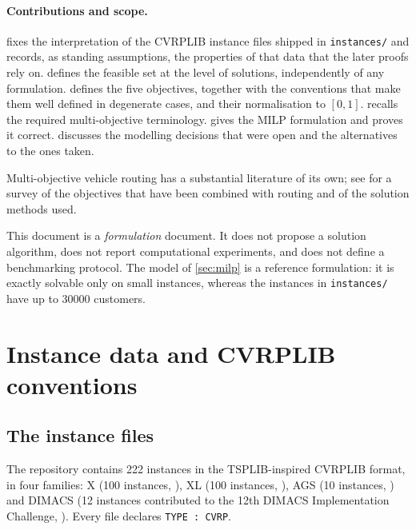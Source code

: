 \documentclass[11pt,a4paper]{article}
\theoremstyle{definition}
\theoremstyle{plain}
\begin{document}
\paragraph{Contributions and scope.}
 fixes the interpretation of the CVRPLIB instance files shipped
in \texttt{instances/} and records, as standing assumptions, the properties of
that data that the later proofs rely on.   defines the
feasible set at the level of solutions, independently of any formulation.
 defines the five objectives, together with the
conventions that make them well defined in degenerate cases, and their
normalisation to $[0,1]$.
 recalls the required multi-objective terminology.
 gives the MILP formulation and proves it correct.
 discusses the modelling decisions that were open and the
alternatives to the ones taken.

Multi-objective vehicle routing has a substantial literature of its own; see
\cite{Jozefowiez2008} for a survey of the objectives that have been combined
with routing and of the solution methods used.

This document is a \emph{formulation} document.  It does not propose a solution
algorithm, does not report computational experiments, and does not define a
benchmarking protocol.  The model of \cref{sec:milp} is a reference
formulation: it is exactly solvable only on small instances, whereas the
instances in \texttt{instances/} have up to \num{30000} customers.

\section{Instance data and CVRPLIB conventions}
\label{sec:data}

\subsection{The instance files}

The repository contains \num{222} instances in the TSPLIB-inspired CVRPLIB
format, in four families: \textsf{X} (\num{100} instances,
\cite{Uchoa2017}), \textsf{XL} (\num{100} instances, \cite{Queiroga2026}),
\textsf{AGS} (\num{10} instances, \cite{Arnold2019}) and \textsf{DIMACS}
(\num{12} instances contributed to the 12th DIMACS Implementation Challenge,
\cite{DIMACS2021}).  Every file declares \texttt{TYPE~:~CVRP}.
\end{document}
